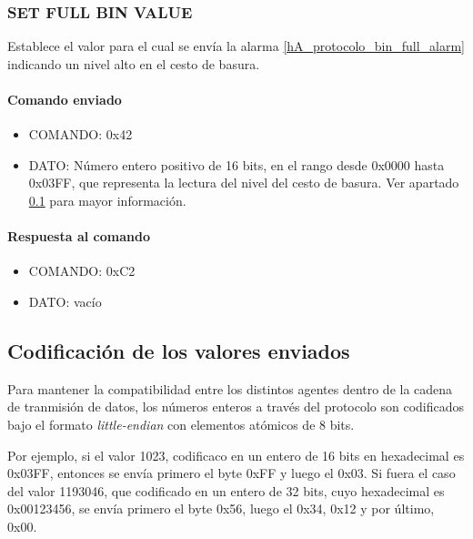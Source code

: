\subsubsection{SET FULL BIN VALUE}
\label{hA_protocolo_set_battery_empty_value}

Establece el valor para el cual se env\'ia la alarma \ref{hA_protocolo_bin_full_alarm} indicando un nivel alto en el cesto de basura.

\paragraph*{Comando enviado}

\begin{itemize}
	\item{COMANDO:} 0x42
	\item{DATO:} N\'umero entero positivo de 16 bits, en el rango desde 0x0000 hasta 0x03FF,
		que representa la lectura del nivel del cesto de basura.
		Ver apartado \ref{hA_protocolo_codificacion} para mayor informaci\'on.
\end{itemize}

\paragraph*{Respuesta al comando}

\begin{itemize}
	\item{COMANDO:} 0xC2
	\item{DATO:} vac\'io
\end{itemize}

\subsection{Codificaci\'on de los valores enviados}
\label{hA_protocolo_codificacion}

Para mantener la compatibilidad entre los distintos agentes dentro de la cadena de tranmisi\'on de datos,
los n\'umeros enteros a trav\'es del protocolo son codificados bajo el formato \emph{little-endian} con elementos at\'omicos de 8 bits.

Por ejemplo, si el valor 1023, codificaco en un entero de 16 bits en hexadecimal es 0x03FF,
entonces se env\'ia primero el byte 0xFF y luego el 0x03.
Si fuera el caso del valor 1193046, que codificado en un entero de 32 bits, cuyo hexadecimal es 0x00123456,
se env\'ia primero el byte 0x56, luego el 0x34, 0x12 y por \'ultimo, 0x00.

